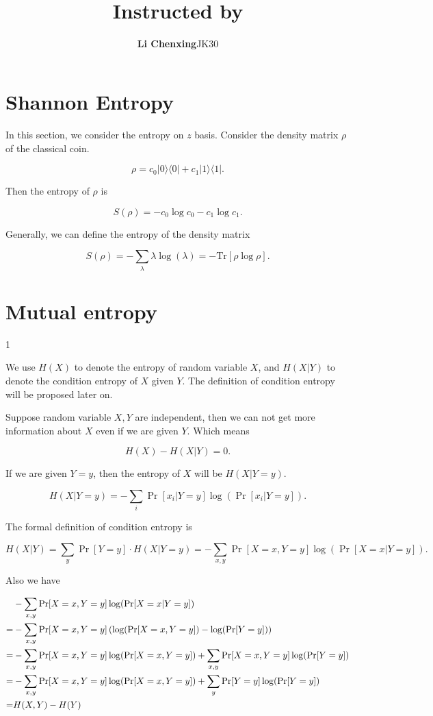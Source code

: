 \documentclass{article}
\title{\textmd{\bf \Class\\ \Title}\\{\large Instructed by \textit{\ClassInstructor}}\\\normalsize\vspace{0.1in}}
\date{}
\newcommand{\StudentName}{Li Chenxing}
\newcommand{\StudentClass}{JK30}
\newcommand{\StudentNumber}{2013012479}
\newcommand{\Tr}{\mathrm{Tr}}
\begin{document}
\begin{CJK}{UTF8}{gkai} %
\begin{spacing}{1.2}
\author{\textbf{\StudentName {}}\qquad\StudentClass\quad\StudentNumber}
\maketitle \thispagestyle{empty}

\section{Shannon Entropy}

In this section, we consider the entropy on $z$ basis. Consider the density matrix $\rho$ of the classical coin.

\[\rho=c_0\vert 0 \rangle \langle 0 \vert+ c_1\vert 1 \rangle\langle 1 \vert.\]

Then the entropy of $\rho$ is

\[S(\rho)=-c_0\log c_0 -c_1 \log c_1.\]

Generally, we can define the entropy of the density matrix 

\[S(\rho)=-\sum_{\lambda}\lambda \log(\lambda)=-\Tr[\rho \log \rho].\]

\section{Mutual entropy}
{\color{white} 1}

We use $H(X)$ to denote the entropy of random variable $X$, and $H(X|Y)$ to denote the condition entropy of $X$ given $Y$. The definition of condition entropy will be proposed later on.

Suppose random variable $X,Y$ are independent, then we can not get more information about $X$ even if we are given $Y$. Which means

\[H(X)-H(X|Y)=0.\]

If we are given $Y=y$, then the entropy of $X$ will be $H(X|Y=y)$.

\[H(X|Y=y)=-\sum_i \Pr[x_i|Y=y]\log(\Pr[x_i|Y=y]).\]

The formal definition of condition entropy is

\[H(X|Y)=\sum_y \Pr[Y=y]\cdot H(X|Y=y)=-\sum_{x,y}\Pr[X=x,Y=y]\log(\Pr[X=x|Y=y]).\]

Also we have

\begin{align}
	&-\sum_{x,y}\Pr[X=x,Y=y]\log(\Pr[X=x|Y=y]) \notag \\
	=&-\sum_{x,y}\Pr[X=x,Y=y]\left(\log(\Pr[X=x,Y=y])-\log(\Pr[Y=y])\right) \notag \\
	=&-\sum_{x,y}\Pr[X=x,Y=y]\log(\Pr[X=x,Y=y])+ \sum_{x,y}\Pr[X=x,Y=y]\log(\Pr[Y=y]) \notag \\
	=& -\sum_{x,y}\Pr[X=x,Y=y]\log(\Pr[X=x,Y=y])+ \sum_{y}\Pr[Y=y]\log(\Pr[Y=y]) \notag \\
	=&H(X,Y)-H(Y) \notag
\end{align}


\end{spacing}
\end{CJK}
\end{document}
